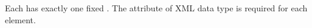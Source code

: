 \subsubsection{}
\label{sec:value}
Each  has exactly one fixed . The  attribute of XML data type  is required for each  element. 
